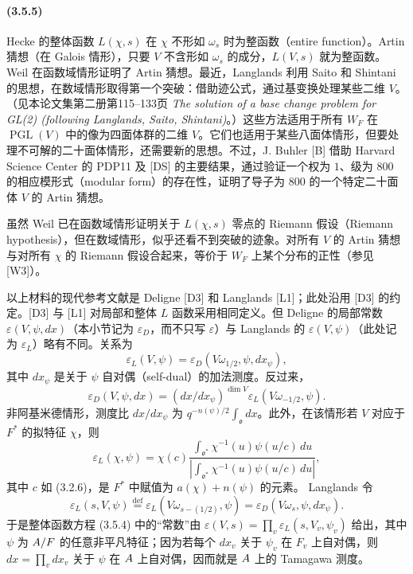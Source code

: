 \paragraph*{(3.5.5)} Hecke 的整体函数 $L(\chi,s)$ 在 $\chi$ 不形如 $\omega_s$ 时为整函数（entire function）。Artin 猜想（在 Galois 情形），只要 $V$ 不含形如 $\omega_s$ 的成分，$L(V,s)$ 就为整函数。Weil 在函数域情形证明了 Artin 猜想。最近，Langlands 利用 Saito 和 Shintani 的思想，在数域情形取得第一个突破：借助迹公式，通过基变换处理某些二维 $V$。（见本论文集第二册第115--133页 \emph{The solution of a base change problem for GL(2) (following Langlands, Saito, Shintani)}。）这些方法适用于所有 $W_F$ 在 $\operatorname{PGL}(V)$ 中的像为四面体群的二维 $V$。它们也适用于某些八面体情形，但要处理不可解的二十面体情形，还需要新的思想。不过，J. Buhler [B] 借助 Harvard Science Center 的 PDP11 及 [DS] 的主要结果，通过验证一个权为 $1$、级为 $800$ 的相应模形式（modular form）的存在性，证明了导子为 $800$ 的一个特定二十面体 $V$ 的 Artin 猜想。

虽然 Weil 已在函数域情形证明关于 $L(\chi,s)$ 零点的 Riemann 假设（Riemann hypothesis），但在数域情形，似乎还看不到突破的迹象。对所有 $V$ 的 Artin 猜想与对所有 $\chi$ 的 Riemann 假设合起来，等价于 $W_F$ 上某个分布的正性（参见 [W3]）。

以上材料的现代参考文献是 Deligne [D3] 和 Langlands [L1]；此处沿用 [D3] 的约定。[D3] 与 [L1] 对局部和整体 $L$ 函数采用相同定义。但 Deligne 的局部常数 $\varepsilon(V,\psi,dx)$（本小节记为 $\varepsilon_D$，而不只写 $\varepsilon$）与 Langlands 的 $\varepsilon(V,\psi)$（此处记为 $\varepsilon_L$）略有不同。关系为
\begin{equation}
 \varepsilon_L(V,\psi)=\varepsilon_D(V\omega_{1/2},\psi,dx_\psi),\tag{3.6.1}
\end{equation}
其中 $dx_\psi$ 是关于 $\psi$ 自对偶（self-dual）的加法测度。反过来，
\begin{equation}
 \varepsilon_D(V,\psi,dx)=(dx/dx_\psi)^{\dim V}\varepsilon_L(V\omega_{-1/2},\psi).\tag{3.6.2}
\end{equation}
非阿基米德情形，测度比 $dx/dx_\psi$ 为 $q^{-n(\psi)/2}\int_{\mathfrak o}dx$。此外，在该情形若 $V$ 对应于 $F^*$ 的拟特征 $\chi$，则
\begin{equation}
 \varepsilon_L(\chi,\psi)=\chi(c)
 \frac{\int_{\mathfrak o^*}\chi^{-1}(u)\psi(u/c)\,du}
 {|\int_{\mathfrak o^*}\chi^{-1}(u)\psi(u/c)\,du|},\tag{3.6.3}
\end{equation}
其中 $c$ 如 (3.2.6)，是 $F^*$ 中赋值为 $a(\chi)+n(\psi)$ 的元素。
Langlands 令
\begin{equation}
 \varepsilon_L(s,V,\psi)\overset{\mathrm{def}}=
 \varepsilon_L(V\omega_{s-(1/2)},\psi)=\varepsilon_D(V\omega_s,\psi,dx_\psi).\tag{3.6.4}
\end{equation}
于是整体函数方程 (3.5.4) 中的“常数”由 $\varepsilon(V,s)=\prod_v\varepsilon_L(s,V_v,\psi_v)$ 给出，其中 $\psi$ 为 $A/F$ 的任意非平凡特征；因为若每个 $dx_v$ 关于 $\psi_v$ 在 $F_v$ 上自对偶，则 $dx=\prod_v dx_v$ 关于 $\psi$ 在 $A$ 上自对偶，因而就是 $A$ 上的 Tamagawa 测度。

